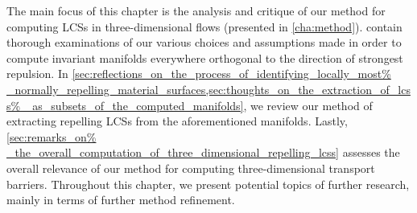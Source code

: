 The main focus of this chapter is the analysis and critique of our method for
computing LCSs in three-dimensional flows (presented in \cref{cha:method}).
 contain thorough
examinations of our various choices and assumptions made in order to compute
invariant manifolds everywhere orthogonal to the direction of strongest
repulsion. In \cref{sec:reflections_on_the_process_of_identifying_locally_most%
_normally_repelling_material_surfaces,sec:thoughts_on_the_extraction_of_lcss%
_as_subsets_of_the_computed_manifolds}, we review our method of extracting
repelling LCSs from the aforementioned manifolds. Lastly, \cref{sec:remarks_on%
_the_overall_computation_of_three_dimensional_repelling_lcss} assesses
the overall relevance of our method for computing three-dimensional transport
barriers. Throughout this chapter, we present potential topics of
further research, mainly in terms of further method refinement.

